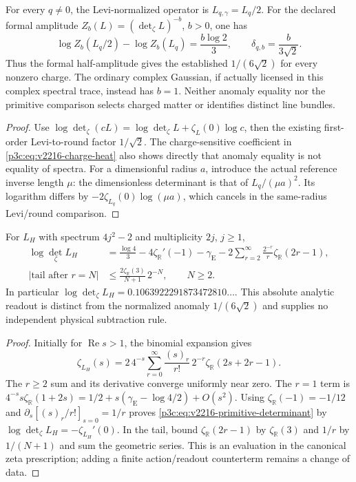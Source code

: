 \documentclass[12pt,a4paper]{article}
\begin{document}
\begin{corollary}
\label{p3c:cor:v2216-all-charge-anomaly}
For every $q\ne0$, the Levi-normalized operator is $L_{q,\gamma}=L_q/2$.
For the declared formal amplitude $Z_b(L)=(\det_\zeta L)^{-b}$,
$b>0$, one has
\[
 \log Z_b(L_q/2)-\log Z_b(L_q)=\frac{b\log2}{3},\qquad
 \delta_{q,b}=\frac{b}{3\sqrt2}.
\]
Thus the formal half-amplitude gives the established
$1/(6\sqrt2)$ for every nonzero charge.  The ordinary complex Gaussian,
if actually licensed in this complex spectral trace, instead has $b=1$.
Neither anomaly equality nor the primitive comparison selects charged
matter or identifies distinct line bundles.
\end{corollary}
\begin{proof}
Use $\log\det_\zeta(cL)=\log\det_\zeta L+\zeta_L(0)\log c$,
then the existing first-order Levi-to-round factor $1/\sqrt2$.
The charge-sensitive coefficient in \eqref{p3c:eq:v2216-charge-heat}
also shows directly that anomaly equality is not equality of spectra.
For a dimensionful radius $a$, introduce the actual reference inverse
length $\mu$: the dimensionless determinant is that of
$L_q/(\mu a)^2$.  Its logarithm differs by
$-2\zeta_{L_q}(0)\log(\mu a)$, which cancels in the same-radius
Levi/round comparison.
\end{proof}

\begin{proposition}
\label{p3c:prop:v2216-convergent-determinant}
For $L_H$ with spectrum $4j^2-2$ and multiplicity $2j$, $j\ge1$,
\begin{align}
 \log\det_\zeta L_H
 &=\frac{\log4}{3}-4\zeta_{\mathbb R}'(-1)-\gamma_{\mathrm E}
   -2\sum_{r=2}^{\infty}\frac{2^{-r}}{r}
                              \zeta_{\mathbb R}(2r-1),
 \label{p3c:eq:v2216-primitive-determinant}\\
 \left|\text{tail after }r=N\right|
 &\le\frac{2\zeta_{\mathbb R}(3)}{N+1}\,2^{-N},\qquad N\ge2.
 \nonumber
\end{align}
In particular $\log\det_\zeta L_H=0.1063922291873472810\ldots$.
This absolute analytic readout is distinct from the normalized anomaly
$1/(6\sqrt2)$ and supplies no independent physical subtraction rule.
\end{proposition}
\begin{proof}
Initially for $\operatorname{Re}s>1$, the binomial expansion gives
\[
 \zeta_{L_H}(s)=2\,4^{-s}\sum_{r=0}^{\infty}
   \frac{(s)_r}{r!}\,2^{-r}\zeta_{\mathbb R}(2s+2r-1).
\]
The $r\ge2$ sum and its derivative converge uniformly near zero.
The $r=1$ term is
$4^{-s}s\zeta_{\mathbb R}(1+2s)
=1/2+s(\gamma_{\mathrm E}-\log4/2)+O(s^2)$.
Using $\zeta_{\mathbb R}(-1)=-1/12$ and
$\partial_s[(s)_r/r!]_{s=0}=1/r$ proves
\eqref{p3c:eq:v2216-primitive-determinant} by
$\log\det_\zeta L_H=-\zeta_{L_H}'(0)$.
In the tail, bound $\zeta_{\mathbb R}(2r-1)$ by
$\zeta_{\mathbb R}(3)$ and $1/r$ by $1/(N+1)$ and sum the geometric
series.  This is an evaluation in the canonical zeta prescription;
adding a finite action/readout counterterm remains a change of data.
\end{proof}
\end{document}

